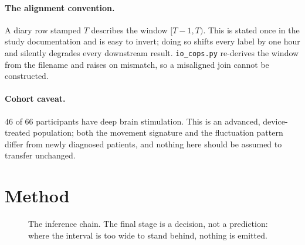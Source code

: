 \documentclass[11pt,a4paper]{article}
\begin{document}
\paragraph{The alignment convention.} A diary row stamped $T$ describes the
window $[T-1, T)$. This is stated once in the study documentation and is easy
to invert; doing so shifts every label by one hour and silently degrades every
downstream result. \texttt{io\_cops.py} re-derives the window from the filename
and raises on mismatch, so a misaligned join cannot be constructed.

\paragraph{Cohort caveat.} $46$ of $66$ participants have deep brain
stimulation. This is an advanced, device-treated population; both the movement
signature and the fluctuation pattern differ from newly diagnosed patients, and
nothing here should be assumed to transfer unchanged.

\section{Method}

\begin{figure}[h]
\centering
{}
\caption{The inference chain. The final stage is a decision, not a prediction:
where the interval is too wide to stand behind, nothing is emitted.}
\end{figure}
\end{document}

